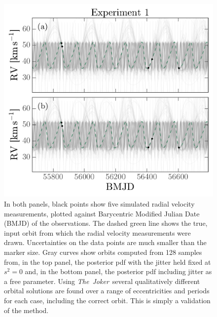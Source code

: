 \documentclass[manuscript, letterpaper]{aastex6}
\newcommand{\project}[1]{\textsl{#1}}
\newcommand{\samplername}{\project{The~Joker}}
\begin{document}
\begin{figure}[p]
\begin{center}
\includegraphics[width=\textwidth]{figures/validation-rv-curves.pdf}
\end{center}
\caption{%
In both panels, black points show five simulated radial velocity measurements, plotted
against Barycentric Modified Julian Date (BMJD) of the observations. The dashed
green line shows the true, input orbit from which the radial velocity measurements
were drawn.
Uncertainties on the data points are much smaller than the marker size.
Gray curves show orbits computed from 128 samples from, in the top panel, the
posterior pdf with the jitter held fixed at $s^2 = 0$ and, in the bottom panel,
the posterior pdf including jitter as a free parameter.
Using \samplername\ several qualitatively different orbital solutions are found over a range of
eccentricities and periods for each case, including the correct orbit.
This is simply a validation of the method.
\label{fig:validation-rv}}
\end{figure}
\end{document}
